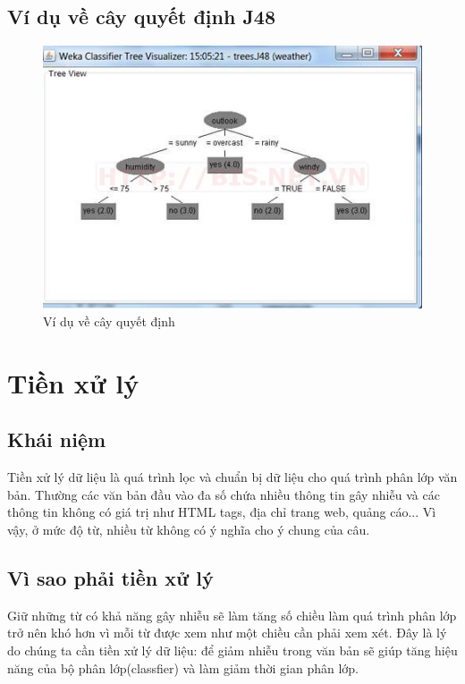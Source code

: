 	\subsection{Ví dụ về cây quyết định J48}
	\begin{figure}[H]
		\centering
		\includegraphics[width=0.9\linewidth]{Chapter2/Chapter2Figs/Decision_Tree_007}
		\caption{Ví dụ về cây quyết định}
		\label{fig:DecisionTreeExample}
	\end{figure}
\section{Tiền xử lý}
\subsection{Khái niệm}
Tiền xử lý dữ liệu là quá trình lọc và chuẩn bị dữ liệu cho quá trình phân lớp văn bản. Thường các văn bản đầu vào đa số chứa nhiều thông tin gây nhiễu và các thông tin không có giá trị như HTML tags, địa chỉ trang web, quảng cáo... Vì vậy, ở mức độ từ, nhiều từ không có ý nghĩa cho ý chung của câu.
\subsection{Vì sao phải tiền xử lý}
Giữ những từ có khả năng gây nhiễu sẽ làm tăng số chiều làm quá trình phân lớp trở nên khó hơn vì mỗi từ được xem như một chiều cần phải xem xét. Đây là lý do chúng ta cần tiền xử lý dữ liệu: để giảm nhiễu trong văn bản sẽ giúp tăng hiệu năng của bộ phân lớp(classfier) và làm giảm thời gian phân lớp.

